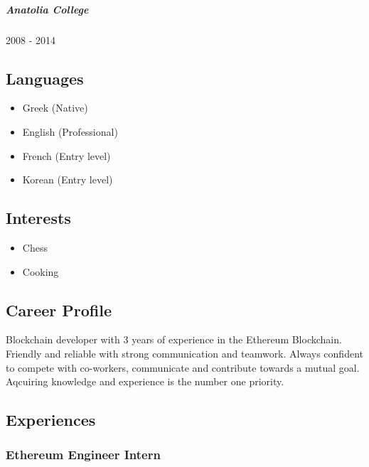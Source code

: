 \documentclass[
  english,
]{article}
\providecommand{\tightlist}{%
  \setlength{\itemsep}{0pt}\setlength{\parskip}{0pt}}
\begin{document}
\hypertarget{anatolia-college}{%
\subparagraph{Anatolia College}\label{anatolia-college}}

2008 - 2014

\hypertarget{languages}{%
\subsection{Languages}\label{languages}}

\begin{itemize}
\tightlist
\item
  Greek {(Native)}
\item
  English {(Professional)}
\item
  French {(Entry level)}
\item
  Korean {(Entry level)}
\end{itemize}

\hypertarget{interests}{%
\subsection{Interests}\label{interests}}

\begin{itemize}
\tightlist
\item
  Chess
\item
  Cooking
\end{itemize}

\hypertarget{career-profile}{%
\subsection{\texorpdfstring{{ \emph{} \emph{} } Career
Profile}{    Career Profile}}\label{career-profile}}

Blockchain developer with 3 years of experience in the Ethereum
Blockchain. Friendly and reliable with strong communication and
teamwork. Always confident to compete with co-workers, communicate and
contribute towards a mutual goal. Aqcuiring knowledge and experience is
the number one priority.

\hypertarget{experiences}{%
\subsection{\texorpdfstring{{ \emph{} \emph{} }
Experiences}{    Experiences}}\label{experiences}}

\hypertarget{ethereum-engineer-intern}{%
\subsubsection{Ethereum Engineer
Intern}\label{ethereum-engineer-intern}}
\end{document}
